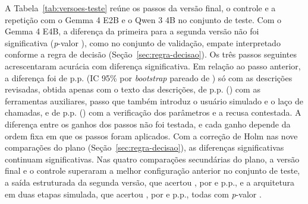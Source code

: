 A Tabela~\ref{tab:versoes-teste} reúne os passos da versão final, o controle e a repetição com o Gemma 4 E2B e o Qwen 3 4B no conjunto de teste. Com o Gemma 4 E4B, a diferença da primeira para a segunda versão não foi significativa (\textit{p}-valor ), como no conjunto de validação, empate interpretado conforme a regra de decisão (Seção~\ref{sec:regra-decisao}). Os três passos seguintes acrescentaram acurácia com diferença significativa. Em relação ao passo anterior, a diferença foi de  p.p. (IC 95\% por \textit{bootstrap} pareado de ) só com as descrições revisadas, obtida apenas com o texto das descrições, de  p.p. () com as ferramentas auxiliares, passo que também introduz o usuário simulado e o laço de chamadas, e de  p.p. () com a verificação dos parâmetros e a recusa contestada. A diferença entre os ganhos dos passos não foi testada, e cada ganho depende da ordem fixa em que os passos foram aplicados. Com a correção de Holm nas nove comparações do plano (Seção~\ref{sec:regra-decisao}), as diferenças significativas continuam significativas. Nas quatro comparações secundárias do plano, a versão final e o controle superaram a melhor configuração anterior no conjunto de teste, a saída estruturada da segunda versão, que acertou , por  e  p.p., e a arquitetura em duas etapas simulada, que acertou , por  e  p.p., todas com \textit{p}-valor .

